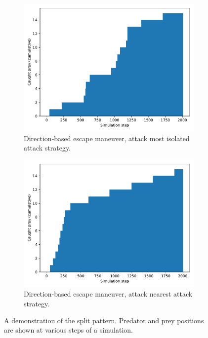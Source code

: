 \documentclass[9pt]{pnas-new}
\begin{document}
\begin{figure}[h]
\begin{subfigure}[t]{0.4\linewidth}
    \end{subfigure}
    \hspace{0.02\linewidth} %
    \begin{subfigure}[t]{0.4\linewidth}
        \includegraphics[width=\linewidth]{avoid_direction_attack_peripheral/predator_success_cumulative_2008.pdf}
        \caption{Direction-based escape maneuver, attack most isolated attack strategy.}
    \end{subfigure}%
    \hspace{0.02\linewidth} %
    \begin{subfigure}[t]{0.4\linewidth}
        \includegraphics[width=\linewidth]{avoid_direction_attack_nearest/predator_success_cumulative_2001.pdf}
        \caption{Direction-based escape maneuver, attack nearest attack strategy.}
    \end{subfigure}
    \caption{A demonstration of the split pattern. Predator and prey positions
	are shown at various steps of a simulation.}
	\label{fig:sim_results_01}
\end{figure}
\end{document}
